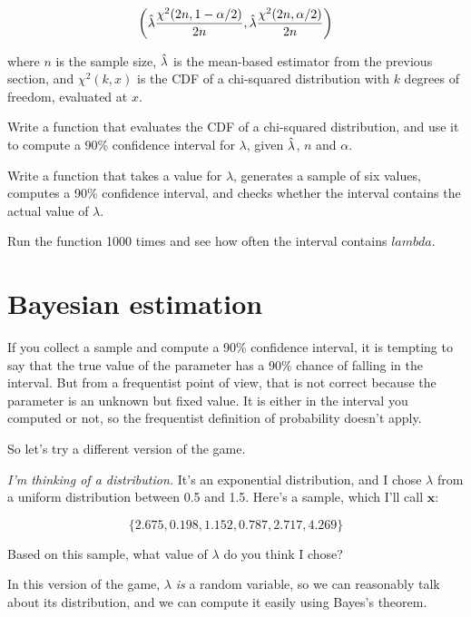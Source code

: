 \documentclass[12pt]{book}
\begin{document}
\[ \left( \hat{\lambda} \frac{\chi^2(2n, 1-\alpha/2)}{2n},
      \hat{\lambda} \frac{\chi^2(2n, \alpha/2)}{2n} \right) \]

where $n$ is the sample size, $\hat{\lambda}$ is the mean-based estimator 
from the previous section, and $\chi^2(k, x)$ is the CDF of a chi-squared
distribution with $k$ degrees of freedom, evaluated at $x$.

\begin{ex}

Write a function that evaluates the CDF of a chi-squared distribution,
and use it to compute a 90\% confidence interval for $\lambda$, given
$\hat{\lambda}$, $n$ and $\alpha$.

Write a function that takes a value for $\lambda$,
generates a sample of six values, computes a 90\% confidence interval,
and checks whether the interval contains the actual value of $\lambda$.

Run the function 1000 times and see how often the interval contains
$lambda$.

\end{ex}


\section{Bayesian estimation}

If you collect a sample and compute a 90\% confidence interval, it is
tempting to say that the true value of the parameter has a 90\% chance
of falling in the interval.  But from a frequentist point of view,
that is not correct because the parameter is an unknown but fixed
value.  It is either in the interval you computed or not, so the
frequentist definition of probability doesn't apply.

So let's try a different version of the game.

\newcommand{\boldx}{\mathbf{x}}

{\em I'm thinking of a distribution.}  It's an exponential
distribution, and I chose $\lambda$ from a uniform distribution
between 0.5 and 1.5.  Here's a sample, which I'll call $\boldx$:

\[ \{ 2.675, 0.198, 1.152, 0.787, 2.717, 4.269 \} \]

Based on this sample, what value of $\lambda$ do you think I chose?

In this version of the game, $\lambda$ {\em is} a random variable, so we
can reasonably talk about its distribution, and we can compute it
easily using Bayes's theorem.
\end{document}
